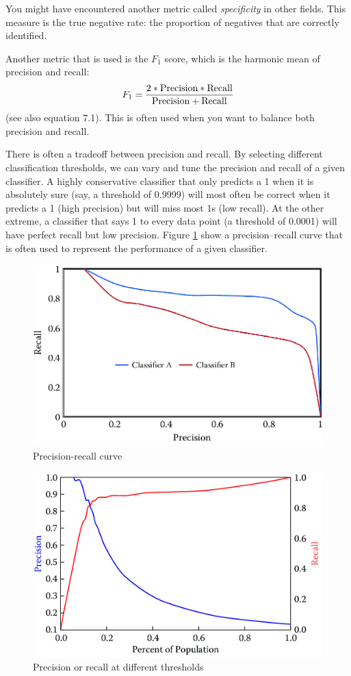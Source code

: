 \documentclass[]{krantz}
\begin{document}
You might have encountered another metric called \emph{specificity} in
other fields. This measure is the true negative rate: the proportion of
negatives that are correctly identified.

Another metric that is used is the \(F_1\) score, which is the harmonic
mean of precision and recall:
\[F_1 =  \frac{2* {\rm Precision} * {\rm Recall}}{{\rm Precision} + {\rm Recall}}\]
(see also equation 7.1). This is often used when you want to balance
both precision and recall.

There is often a tradeoff between precision and recall. By selecting
different classification thresholds, we can vary and tune the precision
and recall of a given classifier. A highly conservative classifier that
only predicts a 1 when it is absolutely sure (say, a threshold of
0.9999) will most often be correct when it predicts a 1 (high precision)
but will miss most 1s (low recall). At the other extreme, a classifier
that says 1 to every data point (a threshold of 0.0001) will have
perfect recall but low precision. Figure \ref{fig:pr} show a
precision--recall curve that is often used to represent the performance
of a given classifier.

\begin{figure}

{\centering \includegraphics[width=0.7\linewidth]{ChapterML/figures/pr} 

}

\caption{Precision-recall curve}\label{fig:pr}
\end{figure}

\begin{figure}

{\centering \includegraphics[width=0.7\linewidth]{ChapterML/figures/pr2} 

}

\caption{Precision or recall at different thresholds}\label{fig:pr2}
\end{figure}
\end{document}
